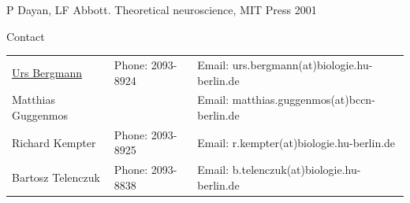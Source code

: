 \documentclass[12pt]{article}
\begin{document}
\begin{thebibliography}{7}
     P Dayan, LF Abbott. Theoretical neuroscience,
        MIT Press 2001
\end{thebibliography}

\vfill
\centerline{\CAP Contact}
\CAP

\begin{tabular}{lll}
\underline{Urs Bergmann} & Phone: 2093-8924 & Email:
urs.bergmann(at)biologie.hu-berlin.de \\
Matthias Guggenmos & & Email: matthias.guggenmos(at)bccn-berlin.de \\
Richard Kempter \hfill & Phone: 2093-8925 \hfill & Email:
r.kempter(at)biologie.hu-berlin.de \\
Bartosz Telenczuk & Phone: 2093-8838 & Email:
b.telenczuk(at)biologie.hu-berlin.de \\
\end{tabular}
\end{document}
